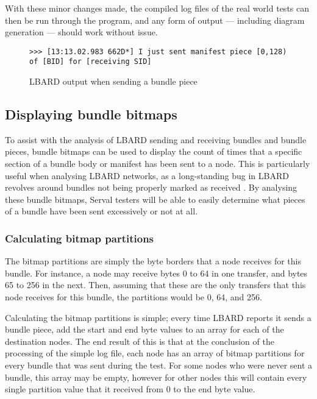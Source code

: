 With these minor changes made, the compiled log files of the real world tests can then be run through the program, and any form of output — including diagram generation — should work without issue.


\begin{figure}
    \begin{centering}
\begin{lstlisting}[basicstyle=\small, breaklines]
    >>> [13:13.02.983 662D*] I just sent manifest piece [0,128) of [BID] for [receiving SID]
\end{lstlisting}
        \caption{LBARD output when sending a bundle piece}
        \label{fig:chapter6RLBARDSent}
    \end{centering}
\end{figure}


\subsection{Displaying bundle bitmaps}
To assist with the analysis of LBARD sending and receiving bundles and bundle pieces, bundle bitmaps can be used to display the count of times that a specific section of a bundle body or manifest has been sent to a node.
This is particularly useful when analysing LBARD networks, as a long-standing bug in LBARD revolves around bundles not being properly marked as received .
By analysing these bundle bitmaps, Serval testers will be able to easily determine what pieces of a bundle have been sent excessively or not at all.

\subsubsection{Calculating bitmap partitions}
The bitmap partitions are simply the byte borders that a node receives for this bundle.
For instance, a node may receive bytes 0 to 64 in one transfer, and bytes 65 to 256 in the next.
Then, assuming that these are the only transfers that this node receives for this bundle, the partitions would be 0, 64, and 256.

Calculating the bitmap partitions is simple; every time LBARD reports it sends a bundle piece, add the start and end byte values to an array for each of the destination nodes.
The end result of this is that at the conclusion of the processing of the simple log file, each node has an array of bitmap partitions for every bundle that was sent during the test.
For some nodes who were never sent a bundle, this array may be empty, however for other nodes this will contain every single partition value that it received from 0 to the end byte value.

